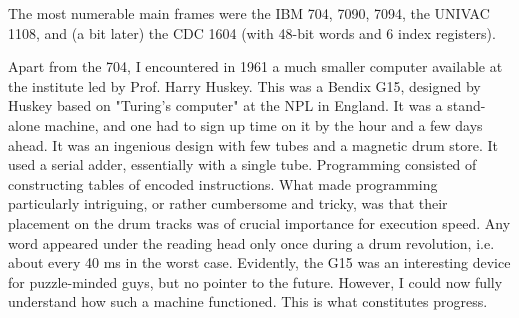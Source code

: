 The most numerable main frames were the IBM 704, 7090, 7094, the UNIVAC 1108, and
(a bit later) the CDC 1604 (with 48-bit words and 6 index registers).

Apart from the 704, I encountered in 1961 a much smaller computer available at the
institute led by Prof. Harry Huskey. This was a Bendix G15, designed by Huskey based
on "Turing's computer" at the NPL in England. It was a stand-alone machine, and one
had to sign up time on it by the hour and a few days ahead. It was an ingenious design
with few tubes and a magnetic drum store. It used a serial adder, essentially with a
single tube. Programming consisted of constructing tables of encoded instructions.
What made programming particularly intriguing, or rather cumbersome and tricky, was
that their placement on the drum tracks was of crucial importance for execution speed.
Any word appeared under the reading head only once during a drum revolution, i.e.
about every 40 ms in the worst case. Evidently, the G15 was an interesting device for
puzzle-minded guys, but no pointer to the future. However, I could now fully
understand how such a machine functioned. This is what constitutes progress.
